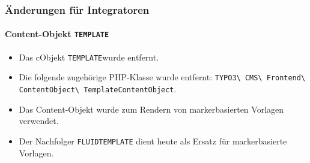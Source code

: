 %

\begin{frame}[fragile]
	\frametitle{Änderungen für Integratoren}
	\framesubtitle{Content-Objekt \small\texttt{TEMPLATE}\normalsize}


	\begin{itemize}
		\item Das cObjekt \small\texttt{TEMPLATE}\normalsize wurde entfernt.
		\item Die folgende zugehörige PHP-Klasse wurde entfernt:\newline
			\smaller\texttt{TYPO3\textbackslash
				CMS\textbackslash
				Frontend\textbackslash
				ContentObject\textbackslash
				TemplateContentObject}.\normalsize
		\item Das Content-Objekt wurde zum Rendern von markerbasierten Vorlagen verwendet.
		\item Der Nachfolger
			\small\texttt{FLUIDTEMPLATE}\normalsize
			\tabto{4.8cm}dient heute als Ersatz für markerbasierte Vorlagen.
	\end{itemize}
\end{frame}


